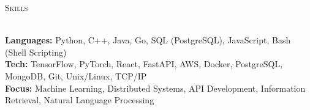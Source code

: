 \documentclass[a4paper]{article}
\newcommand{\tinyBulletSep} { \vspace{1.2mm} }
\newcommand{\bulletSep} { \vspace{1.5mm} }
\newcommand{\sectionSep} { \vspace{\stretch{1}} }
\newcommand{\lineunder} {
    \vspace*{-8pt} \\
    \hspace*{-15pt} \hrulefill \\
}
\newcommand{\header} [1] {
    {\hspace*{-18pt}\vspace*{6pt} {
        \fontfamily{qcs}\selectfont \large \scshape #1
    }}
    \vspace*{-6pt} \lineunder
    \vspace{1.1mm}
}
\newcommand{\volunteerItem}[5]{
    \textbf{#1} -- \textit{#2} \hfill #3 \\
    \begin{itemize}
        #4
    \end{itemize}
}
\newcommand{\link}[2]{
    {\fontfamily{lmtt}\selectfont\href{#1}{#2}}
}
\begin{document}










\sectionSep


\header{Skills}

\textbf{Languages:}  Python, C++, Java, Go, SQL (PostgreSQL), JavaScript, Bash (Shell Scripting)
\\
\textbf{Tech:} TensorFlow, PyTorch, React, FastAPI, AWS, Docker, PostgreSQL, MongoDB, Git, Unix/Linux, TCP/IP\\
\textbf{Focus:} Machine Learning, Distributed Systems, API Development, Information Retrieval, Natural Language Processing\\


\vfill
\end{document}

